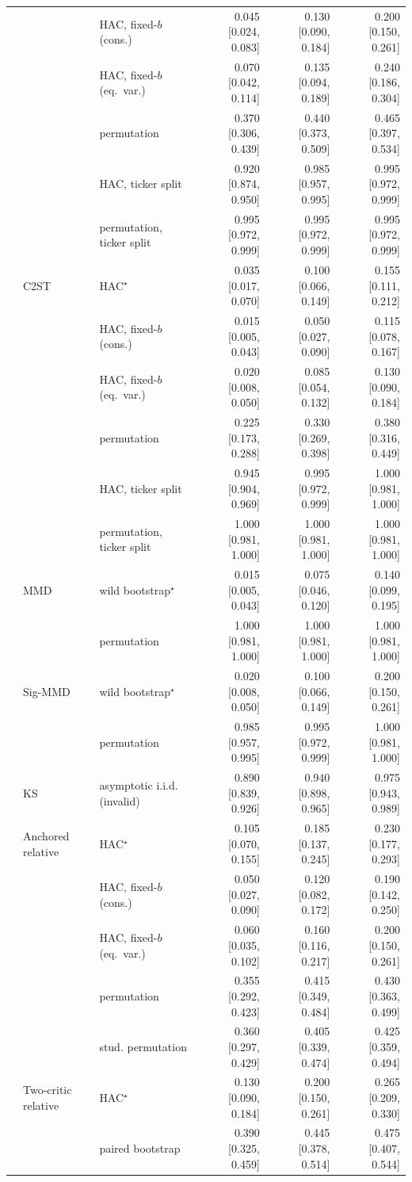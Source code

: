 \begin{tabular}{lllrrr}
 &  & HAC, fixed-$b$ (cons.) & 0.045 [0.024, 0.083] & 0.130 [0.090, 0.184] & 0.200 [0.150, 0.261] \\
 &  & HAC, fixed-$b$ (eq.\ var.) & 0.070 [0.042, 0.114] & 0.135 [0.094, 0.189] & 0.240 [0.186, 0.304] \\
 &  & permutation & 0.370 [0.306, 0.439] & 0.440 [0.373, 0.509] & 0.465 [0.397, 0.534] \\
 &  & HAC, ticker split & 0.920 [0.874, 0.950] & 0.985 [0.957, 0.995] & 0.995 [0.972, 0.999] \\
 &  & permutation, ticker split & 0.995 [0.972, 0.999] & 0.995 [0.972, 0.999] & 0.995 [0.972, 0.999] \\
 & C2ST & HAC$^{\star}$ & 0.035 [0.017, 0.070] & 0.100 [0.066, 0.149] & 0.155 [0.111, 0.212] \\
 &  & HAC, fixed-$b$ (cons.) & 0.015 [0.005, 0.043] & 0.050 [0.027, 0.090] & 0.115 [0.078, 0.167] \\
 &  & HAC, fixed-$b$ (eq.\ var.) & 0.020 [0.008, 0.050] & 0.085 [0.054, 0.132] & 0.130 [0.090, 0.184] \\
 &  & permutation & 0.225 [0.173, 0.288] & 0.330 [0.269, 0.398] & 0.380 [0.316, 0.449] \\
 &  & HAC, ticker split & 0.945 [0.904, 0.969] & 0.995 [0.972, 0.999] & 1.000 [0.981, 1.000] \\
 &  & permutation, ticker split & 1.000 [0.981, 1.000] & 1.000 [0.981, 1.000] & 1.000 [0.981, 1.000] \\
 & MMD & wild bootstrap$^{\star}$ & 0.015 [0.005, 0.043] & 0.075 [0.046, 0.120] & 0.140 [0.099, 0.195] \\
 &  & permutation & 1.000 [0.981, 1.000] & 1.000 [0.981, 1.000] & 1.000 [0.981, 1.000] \\
 & Sig-MMD & wild bootstrap$^{\star}$ & 0.020 [0.008, 0.050] & 0.100 [0.066, 0.149] & 0.200 [0.150, 0.261] \\
 &  & permutation & 0.985 [0.957, 0.995] & 0.995 [0.972, 0.999] & 1.000 [0.981, 1.000] \\
 & KS & asymptotic i.i.d. (invalid) & 0.890 [0.839, 0.926] & 0.940 [0.898, 0.965] & 0.975 [0.943, 0.989] \\
 & Anchored relative & HAC$^{\star}$ & 0.105 [0.070, 0.155] & 0.185 [0.137, 0.245] & 0.230 [0.177, 0.293] \\
 &  & HAC, fixed-$b$ (cons.) & 0.050 [0.027, 0.090] & 0.120 [0.082, 0.172] & 0.190 [0.142, 0.250] \\
 &  & HAC, fixed-$b$ (eq.\ var.) & 0.060 [0.035, 0.102] & 0.160 [0.116, 0.217] & 0.200 [0.150, 0.261] \\
 &  & permutation & 0.355 [0.292, 0.423] & 0.415 [0.349, 0.484] & 0.430 [0.363, 0.499] \\
 &  & stud. permutation & 0.360 [0.297, 0.429] & 0.405 [0.339, 0.474] & 0.425 [0.359, 0.494] \\
 & Two-critic relative & HAC$^{\star}$ & 0.130 [0.090, 0.184] & 0.200 [0.150, 0.261] & 0.265 [0.209, 0.330] \\
 &  & paired bootstrap & 0.390 [0.325, 0.459] & 0.445 [0.378, 0.514] & 0.475 [0.407, 0.544] \\
\bottomrule
\end{tabular}
